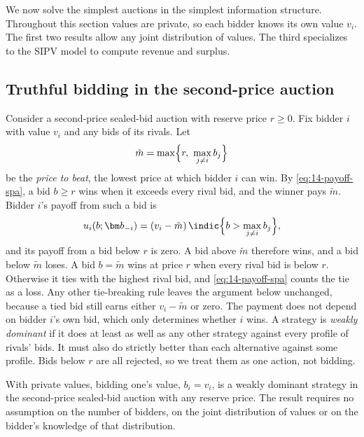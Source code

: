 We now solve the simplest auctions in the simplest information structure. Throughout this section values
are private, so each bidder knows its own value $v_i$. The first two results allow any joint distribution
of values. The third specializes to the SIPV model to compute revenue and surplus.

\subsection{Truthful bidding in the second-price auction}\label{sec:14-spa-dominance}

Consider a second-price sealed-bid auction with reserve price $r\ge 0$. Fix bidder $i$ with value $v_i$ and
any bids of its rivals. Let
\[
\tilde m=\max\Bigl\{r,\ \max_{j\neq i}b_j\Bigr\}
\]
be the \emph{price to beat}, the lowest price at which bidder $i$ can win. By \eqref{eq:14-payoff-spa}, a
bid $b\ge r$ wins when it exceeds every rival bid, and the winner pays $\tilde m$. Bidder $i$'s payoff from
such a bid is
\begin{equation}\label{eq:14-spa-payoff}
u_i(b;\bm b_{-i})=(v_i-\tilde m)\,\indic\Bigl\{b>\max_{j\neq i}b_j\Bigr\},
\end{equation}
and its payoff from a bid below $r$ is zero. A bid above $\tilde m$ therefore wins, and a bid below
$\tilde m$ loses. A bid $b=\tilde m$ wins at price $r$ when every rival bid is below $r$. Otherwise it ties
with the highest rival bid, and \eqref{eq:14-payoff-spa} counts the tie as a loss. Any other tie-breaking
rule leaves the argument below unchanged, because a tied bid still earns either $v_i-\tilde m$ or zero.
The payment does not depend on bidder $i$'s own bid, which
only determines whether $i$ wins. A strategy is \emph{weakly dominant} if it does at least as well as any other
strategy against every profile of rivals' bids. It must also do strictly better than each alternative
against some profile. Bids below $r$ are all rejected, so we treat them as one action, not bidding.

\begin{proposition}[Vickrey 1961]\label{prop:14-spa-dominant}
With private values, bidding one's value, $b_i=v_i$, is a weakly dominant strategy in the second-price
sealed-bid auction with any reserve price. The result requires no assumption on the number of bidders, on
the joint distribution of values or on the bidder's knowledge of that distribution.
\end{proposition}

